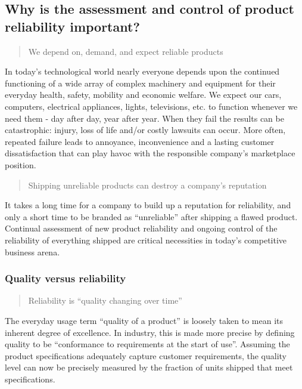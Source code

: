 \documentclass[]{book}
\theoremstyle{definition}
\theoremstyle{definition}
\theoremstyle{definition}
\theoremstyle{remark}
\begin{document}
\subsection{Why is the assessment and control of product reliability
important?}\label{why-is-the-assessment-and-control-of-product-reliability-important}

\begin{quote}
We depend on, demand, and expect reliable products
\end{quote}

In today's technological world nearly everyone depends upon the
continued functioning of a wide array of complex machinery and equipment
for their everyday health, safety, mobility and economic welfare. We
expect our cars, computers, electrical appliances, lights, televisions,
etc. to function whenever we need them - day after day, year after year.
When they fail the results can be catastrophic: injury, loss of life
and/or costly lawsuits can occur. More often, repeated failure leads to
annoyance, inconvenience and a lasting customer dissatisfaction that can
play havoc with the responsible company's marketplace position.

\begin{quote}
Shipping unreliable products can destroy a company's reputation
\end{quote}

It takes a long time for a company to build up a reputation for
reliability, and only a short time to be branded as ``unreliable'' after
shipping a flawed product. Continual assessment of new product
reliability and ongoing control of the reliability of everything shipped
are critical necessities in today's competitive business arena.

\subsubsection{Quality versus
reliability}\label{quality-versus-reliability}

\begin{quote}
Reliability is ``quality changing over time''
\end{quote}

The everyday usage term ``quality of a product'' is loosely taken to
mean its inherent degree of excellence. In industry, this is made more
precise by defining quality to be ``conformance to requirements at the
start of use''. Assuming the product specifications adequately capture
customer requirements, the quality level can now be precisely measured
by the fraction of units shipped that meet specifications.
\end{document}
